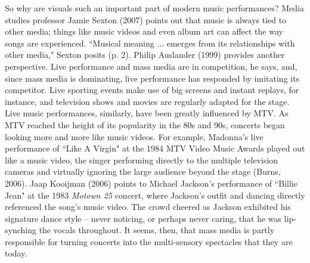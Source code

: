 
So why are visuals such an important part of modern music performances? Media studies professor Jamie Sexton (2007) points out that music is always tied to other media; things like music videos and even album art can affect the way songs are experienced. ``Musical meaning ... emerges from its relationships with other media," Sexton posits (p. 2). Philip Auslander (1999) provides another perspective. Live performance and mass media are in competition, he says, and, since mass media is dominating, live performance has responded by imitating its competitor. Live sporting events make use of big screens and instant replays, for instance, and television shows and movies are regularly adapted for the stage. Live music performances, similarly, have been greatly influenced by MTV. As MTV reached the height of its popularity in the 80s and 90s, concerts began looking more and more like music videos. For example, Madonna's live performance of ``Like A Virgin" at the 1984 MTV Video Music Awards played out like a music video, the singer performing directly to the multiple television cameras and virtually ignoring the large audience beyond the stage (Burns, 2006). Jaap Kooijman (2006) points to Michael Jackson's performance of ``Billie Jean" at the 1983 \textit{Motown 25} concert, where Jackson's outfit and dancing directly referenced the song's music video. The crowd cheered as Jackson exhibited his signature dance style -- never noticing, or perhaps never caring, that he was lip-synching the vocals throughout. It seems, then, that mass media is partly responsible for turning concerts into the multi-sensory spectacles that they are today.
